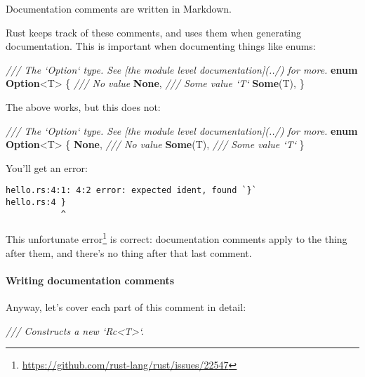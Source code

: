 \documentclass[a4paper,]{book}
\newenvironment{Shaded}{\begin{snugshade}}{\end{snugshade}}
\newcommand{\KeywordTok}[1]{\textcolor[rgb]{0.13,0.29,0.53}{\textbf{{#1}}}}
\newcommand{\CommentTok}[1]{\textcolor[rgb]{0.56,0.35,0.01}{\textit{{#1}}}}
\newcommand{\NormalTok}[1]{{#1}}
\renewcommand{\href}[2]{#2\footnote{\url{#1}}}
\begin{document}
Documentation comments are written in Markdown.

Rust keeps track of these comments, and uses them when generating
documentation. This is important when documenting things like enums:

\begin{Shaded}
\begin{Highlighting}[]
\CommentTok{/// The `Option` type. See [the module level documentation](../) for more.}
\KeywordTok{enum} \KeywordTok{Option}\NormalTok{<T> \{}
    \CommentTok{/// No value}
    \KeywordTok{None}\NormalTok{,}
    \CommentTok{/// Some value `T`}
    \KeywordTok{Some}\NormalTok{(T),}
\NormalTok{\}}
\end{Highlighting}
\end{Shaded}

The above works, but this does not:

\begin{Shaded}
\begin{Highlighting}[]
\CommentTok{/// The `Option` type. See [the module level documentation](../) for more.}
\KeywordTok{enum} \KeywordTok{Option}\NormalTok{<T> \{}
    \KeywordTok{None}\NormalTok{, }\CommentTok{/// No value}
    \KeywordTok{Some}\NormalTok{(T), }\CommentTok{/// Some value `T`}
\NormalTok{\}}
\end{Highlighting}
\end{Shaded}

You'll get an error:

\begin{verbatim}
hello.rs:4:1: 4:2 error: expected ident, found `}`
hello.rs:4 }
           ^
\end{verbatim}

This \href{https://github.com/rust-lang/rust/issues/22547}{unfortunate
error} is correct: documentation comments apply to the thing after them,
and there's no thing after that last comment.

\paragraph{Writing documentation
comments}\label{writing-documentation-comments}

Anyway, let's cover each part of this comment in detail:

\begin{Shaded}
\begin{Highlighting}[]
\CommentTok{/// Constructs a new `Rc<T>`.}
\end{Highlighting}
\end{Shaded}
\end{document}
